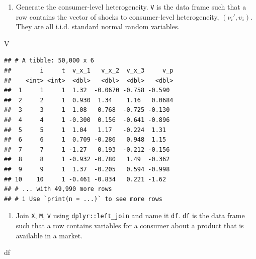\documentclass[
]{book}
\newenvironment{Shaded}{\begin{snugshade}}{\end{snugshade}}
\newcommand{\NormalTok}[1]{#1}
\providecommand{\tightlist}{%
  \setlength{\itemsep}{0pt}\setlength{\parskip}{0pt}}
\begin{document}
\begin{enumerate}
\def\labelenumi{\arabic{enumi}.}
\setcounter{enumi}{3}
\tightlist
\item
  Generate the consumer-level heterogeneity. \texttt{V} is the data frame such that a row contains the vector of shocks to consumer-level heterogeneity, \((\nu_{i}', \upsilon_i)\). They are all i.i.d. standard normal random variables.
\end{enumerate}

\begin{Shaded}
\begin{Highlighting}[]
\NormalTok{V}
\end{Highlighting}
\end{Shaded}

\begin{verbatim}
## # A tibble: 50,000 x 6
##        i     t  v_x_1   v_x_2  v_x_3     v_p
##    <int> <int>  <dbl>   <dbl>  <dbl>   <dbl>
##  1     1     1  1.32  -0.0670 -0.758 -0.590 
##  2     2     1  0.930  1.34    1.16   0.0684
##  3     3     1  1.08   0.768  -0.725 -0.130 
##  4     4     1 -0.300  0.156  -0.641 -0.896 
##  5     5     1  1.04   1.17   -0.224  1.31  
##  6     6     1  0.709 -0.286   0.948  1.15  
##  7     7     1 -1.27   0.193  -0.212 -0.156 
##  8     8     1 -0.932 -0.780   1.49  -0.362 
##  9     9     1  1.37  -0.205   0.594 -0.998 
## 10    10     1 -0.461 -0.834   0.221 -1.62  
## # ... with 49,990 more rows
## # i Use `print(n = ...)` to see more rows
\end{verbatim}

\begin{enumerate}
\def\labelenumi{\arabic{enumi}.}
\setcounter{enumi}{4}
\tightlist
\item
  Join \texttt{X}, \texttt{M}, \texttt{V} using \texttt{dplyr::left\_join} and name it \texttt{df}. \texttt{df} is the data frame such that a row contains variables for a consumer about a product that is available in a market.
\end{enumerate}

\begin{Shaded}
\begin{Highlighting}[]
\NormalTok{df}
\end{Highlighting}
\end{Shaded}
\end{document}
